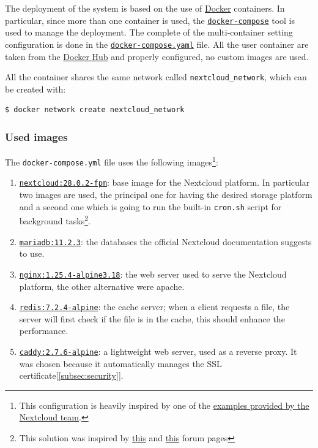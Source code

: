 The deployment of the system is based on the use of \href{https://www.docker.com/}{Docker} containers.
In particular, since more than one container is used, the \href{https://docs.docker.com/compose/}{\texttt{docker-compose}} tool is used to manage the deployment.
The complete of the multi-container setting configuration is done in the \href{https://github.com/IsacPasianotto/cloud-computing-assignment/blob/main/exercise01/docker-compose.yaml}{\texttt{docker-compose.yaml}} file.
All the user container are taken from the \href{https://hub.docker.com/}{Docker Hub} and properly configured, no custom images are used.

All the container shares the same network called \texttt{nextcloud\_network}, which can be created with:

\begin{lstlisting}[language=bash]
$ docker network create nextcloud_network
\end{lstlisting}

\subsubsection{Used images}
The \texttt{docker-compose.yml} file uses the following images\footnote{This configuration is heavily inspired by one of the \href{https://github.com/nextcloud/docker/blob/master/.examples/docker-compose/with-nginx-proxy/mariadb/fpm/docker-compose.yml}{examples provided by the Nextcloud team}.}:

\begin{enumerate}
    \itemsep0em
    \item \href{https://hub.docker.com/layers/library/nextcloud/28.0.2-fpm/images/sha256-dc1b232c39cd29fe81442f0e4d1c523148afecaf0bcf1cdffb7c52441bf63af7?context=explore}{\texttt{nextcloud:28.0.2-fpm}}: 
    base image for the Nextcloud platform. In particular two images are used, the principal one for having the desired storage platform and a second one which is going to run the built-in \texttt{cron.sh}  script for background tasks\footnote{This solution was inspired by \href{https://help.nextcloud.com/t/nextcloud-docker-container-best-way-to-run-cron-job/157734/2}{this} and \href{https://help.nextcloud.com/t/clarification-regarding-cron-jobs-setup-config/134450}{this} forum pages}.
    \item \href{https://hub.docker.com/_/mariadb}{\texttt{mariadb:11.2.3}}: the databases the official Nextcloud documentation suggests to use. 
    \item \href{https://hub.docker.com/_/nginx}{\texttt{nginx:1.25.4-alpine3.18}}: the web server used to serve the Nextcloud platform, the other alternative were apache.
    \item \href{https://hub.docker.com/_/redis}{\texttt{redis:7.2.4-alpine}}: the cache server; when a client requests a file, the server will first check if the file is in the cache, this should enhance the performance.
    \item \href{https://hub.docker.com/_/caddy}{\texttt{caddy:2.7.6-alpine}}: a lightweight web server, used as a reverse proxy. It was chosen because it automatically manages the SSL certificate[\ref{subsec:security}].
\end{enumerate}

